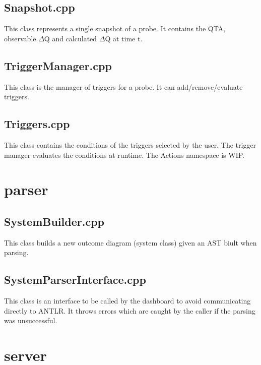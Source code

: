 \subsection{Snapshot.cpp} \label{code:snaps}
This class represents a single snapshot of a probe. It contains the QTA, observable $\Delta$Q and calculated $\Delta$Q at time t.


\subsection{TriggerManager.cpp} \label{code:trigman}
This class is the manager of triggers for a probe. It can add/remove/evaluate triggers.


\subsection{Triggers.cpp} \label{code:trigg}
This class contains the conditions of the triggers selected by the user. The trigger manager evaluates the conditions at runtime. The Actions namespace is WIP.


\section{parser}

\subsection{SystemBuilder.cpp} \label{code:sysb}
This class builds a new outcome diagram (system class) given an AST biult when parsing.


\subsection{SystemParserInterface.cpp} \label{code:syspi}
This class is an interface to be called by the dashboard to avoid communicating directly to ANTLR. It throws errors which are caught by the caller if the parsing was unsuccessful.


\section{server}

